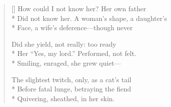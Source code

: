 \label{ch:lear_as}
\settowidth{\versewidth}{Did not know her.  A woman's shape, a daughter's}
\begin{verse}[\versewidth]
 How could I not know her? Her own father\\*
Did not know her.  A woman's shape, a daughter's\\*
Face, a wife's deference---though never

Did she yield, not really: too ready\\*
Her ``Yes, my lord.''  Performed, not felt.\\*
Smiling, enraged, she grew quiet---

The slightest twitch, only, as a cat's tail\\*
Before fatal lunge, betraying the fiend\\*
Quivering, sheathed, in her skin.
\end{verse}
